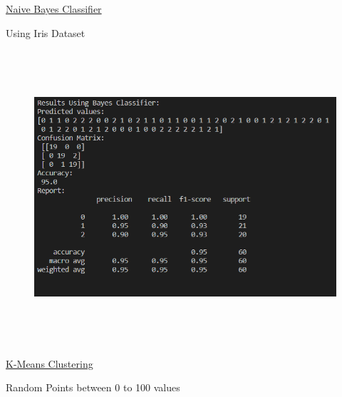 \documentclass[12pt]{article}
\renewcommand{\_}{\kern-1.5pt\textunderscore\kern-1.5pt}
\begin{document}
\vspace{\baselineskip}
{\fontsize{14pt}{16.8pt}\selectfont \uline{Naive Bayes Classifier}\par}\par

{\fontsize{14pt}{16.8pt}\selectfont Using Iris Dataset\par}\par




\begin{figure}[H]
	\begin{Center}
		\includegraphics[width=6.5in,height=4.29in]{./media/image16.png}
	\end{Center}
\end{figure}



\par

{\fontsize{14pt}{16.8pt}\selectfont \uline{K-Means Clustering}\par}\par

{\fontsize{14pt}{16.8pt} Random Points between 0 to 100 values\par}\par



\end{document}

